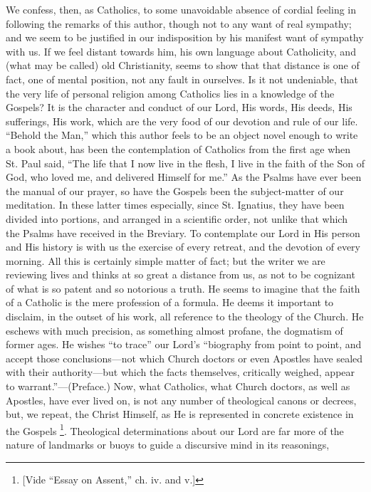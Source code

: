 We confess, then, as Catholics, to some
unavoidable absence of cordial feeling in following the remarks of
this author, though not to any want of real sympathy; and we seem to
be justified in our indisposition by his manifest want of sympathy
with us. If we feel distant towards him, his own language about
Catholicity, and (what may be called) old Christianity, seems to show
that that distance is one of fact, one of mental position, not any
fault in ourselves. Is it not undeniable, that the very life of
personal religion among Catholics lies in a knowledge of the Gospels?
It is the character and conduct of our Lord, His words, His deeds, His
sufferings, His work, which are the very food of our devotion and rule
of our life. ``Behold the Man,'' which this author feels to be an object
novel enough to write a book about, has been the contemplation of
Catholics from the first age when St. Paul said, ``The life that I now
live in the flesh, I live in the faith of the Son of God, who loved
me, and delivered Himself for me.'' As the Psalms have ever been the
manual of our prayer, so have the Gospels been the subject-matter of
our meditation. In these latter times especially, since St. Ignatius,
they have been divided into portions, and arranged in a scientific
order, not unlike that which the Psalms have received in the Breviary.
To contemplate our Lord in His person and His history is with us the
exercise of every retreat, and the devotion of every morning. All this
is certainly simple matter of fact; but the writer we are reviewing
lives and thinks at so great a distance from us, as not to be
cognizant of what is so patent and so notorious a truth. He seems to
imagine that the faith of a Catholic is the mere profession of a
formula. He deems it important to disclaim, in the outset of his
work, all reference to the theology of the Church. He eschews with
much precision, as something almost profane, the dogmatism of former
ages. He wishes ``to trace'' our Lord's ``biography from point to point,
and accept those conclusions—not which Church doctors or even
Apostles have sealed with their authority—but which the facts
themselves, critically weighed, appear to warrant.''—(Preface.) Now,
what Catholics, what Church doctors, as well as Apostles, have ever
lived on, is not any number of theological canons or decrees, but, we
repeat, the Christ Himself, as He is represented in concrete existence
in the Gospels \footnote{[Vide ``Essay on Assent,'' ch. iv. and v.]}.
Theological determinations about our Lord are far more of the nature
of landmarks or buoys to guide a discursive mind in its reasonings,
